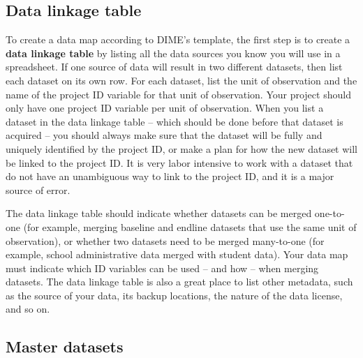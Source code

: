 \subsection{Data linkage table}

To create a data map according to DIME's template,
the first step is to create a \textbf{data linkage table} by listing
all the data sources you know you will use in a spreadsheet.
If one source of data will result in two different datasets,
then list each dataset on its own row.
For each dataset, list the unit of observation
and the name of the project ID variable for that unit of observation.
Your project should only have one project ID variable per unit of observation.
When you list a dataset in the data linkage table --
which should be done before that dataset is acquired --
you should always make sure that the dataset will
be fully and uniquely identified by the project ID,
or make a plan for how
the new dataset will be linked to the project ID.
It is very labor intensive to work with a dataset that
do not have an unambiguous way to link to the project ID,
and it is a major source of error.

The data linkage table should indicate whether
datasets can be merged one-to-one (for example,
merging baseline and endline datasets
that use the same unit of observation),
or whether two datasets need to be merged many-to-one
(for example, school administrative data merged with student data).
Your data map must indicate which ID variables
can be used -- and how -- when merging datasets.
The data linkage table is also a great place to list other metadata,
such as the source of your data, its backup locations,
the nature of the data license, and so on.

\subsection{Master datasets}


